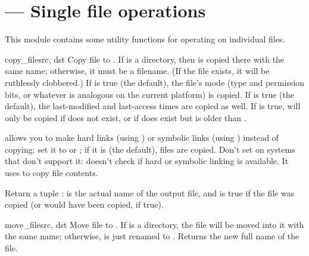 \documentclass{manual}
\begin{document}
\section{ --- Single file operations}

This module contains some utility functions for operating on individual files.

\begin{funcdesc}{copy_file}{src, dst}
Copy file  to . If  is a directory, then
 is copied there with the same name; otherwise, it must be a
filename. (If the file exists, it will be ruthlessly clobbered.) If
 is true (the default), the file's mode (type and
permission bits, or whatever is analogous on the current platform) is
copied. If  is true (the default), the last-modified
and last-access times are copied as well. If  is true,
 will only be copied if  does not exist, or if
 does exist but is older than .

 allows you to make hard links (using ) or
symbolic links (using ) instead of copying: set it
to  or ; if it is  (the default),
files are copied. Don't set  on systems that don't support
it:  doesn't check if hard or symbolic linking is
available.  It uses  to copy file contents.

Return a tuple :  is the actual 
name of the output file, and  is true if the file was copied 
(or would have been copied, if  true).
\end{funcdesc}

\begin{funcdesc}{move_file}{src, dst}
Move file  to . If  is a directory, the file will
be moved into it with the same name; otherwise,  is just renamed
to .  Returns the new full name of the file.
\end{funcdesc}
\end{document}
